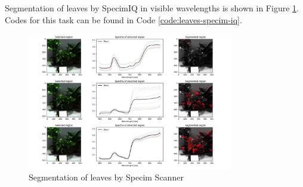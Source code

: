 Segmentation of leaves by SpecimIQ in visible wavelengths is shown in
Figure \ref{fig:leaves-specim-iq}.
Codes for this task can be found in Code \ref{code:leaves-specim-iq}.

\begin{figure}[H]
  \centering
  \includegraphics[width=0.8\textwidth]{./fig/task2/specim-iq.png}
  \caption{Segmentation of leaves by Specim Scanner }
  \label{fig:leaves-specim-iq}
\end{figure}